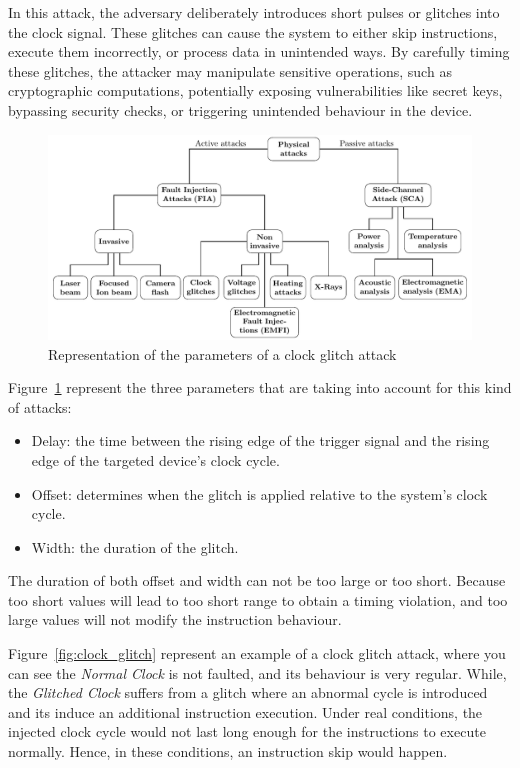 In this attack, the adversary deliberately introduces short pulses or glitches into the clock signal. These glitches can cause the system to either skip instructions, execute them incorrectly, or process data in unintended ways. By carefully timing these glitches, the attacker may manipulate sensitive operations, such as cryptographic computations, potentially exposing vulnerabilities like secret keys, bypassing security checks, or triggering unintended behaviour in the device.

\begin{figure}[ht]
    \centering
    \includegraphics[page=5]{c2_soa/img/physicalAttacks.pdf}
    \caption{Representation of the parameters of a clock glitch attack}
    \label{fig:clock_glitch_parameters}
\end{figure}

Figure~\ref{fig:clock_glitch_parameters} represent the three parameters that are taking into account for this kind of attacks:
\begin{itemize}
    \item Delay: the time between the rising edge of the trigger signal and the rising edge of the targeted device's clock cycle.
    \item Offset: determines when the glitch is applied relative to the system's clock cycle.
    \item Width: the duration of the glitch.
\end{itemize}

The duration of both offset and width can not be too large or too short. Because too short values will lead to too short range to obtain a timing violation, and too large values will not modify the instruction behaviour.

Figure~\ref{fig:clock_glitch} represent an example of a clock glitch attack, where you can see the \textit{Normal Clock} is not faulted, and its behaviour is very regular. While, the \textit{Glitched Clock} suffers from a glitch where an abnormal cycle is introduced and its induce an additional instruction execution. Under real conditions, the injected clock cycle would not last long enough for the instructions to execute normally. Hence, in these conditions, an instruction skip would happen.

